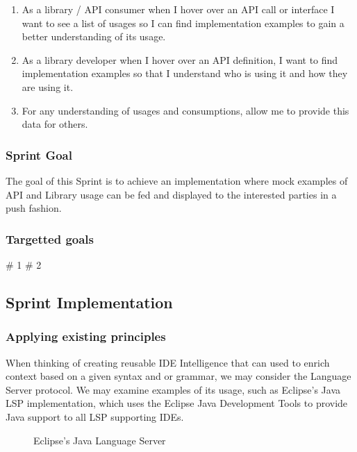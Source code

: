 \begin{enumerate}

	\item  As a library / API consumer when I hover over an API call or interface I want to see a list of usages so I can find implementation examples to gain a better  understanding of its usage.
	
	\item As a library developer when I hover over an API definition, I want to find implementation examples so that I understand who is using it and how they are using it. 
	
	\item For any understanding of usages and consumptions, allow me to provide this data for others.
	
\end{enumerate}

\subsubsection{Sprint  Goal}

The goal of this Sprint is to achieve an implementation where mock examples of API and Library usage can be fed and displayed to the interested parties in a push fashion.

\subsubsection{Targetted goals}

\# 1
\# 2

\subsection{Sprint Implementation}

\subsubsection{Applying existing principles}

When thinking of creating reusable IDE Intelligence that can used to enrich context based on a given syntax and or grammar, we may consider the Language Server protocol. We may examine examples of its usage, such as Eclipse's Java LSP implementation, which uses the Eclipse Java Development Tools to provide Java support to all LSP supporting IDEs.

\begin{figure}[h!]


\caption{Eclipse's Java Language Server}

\end{figure}


